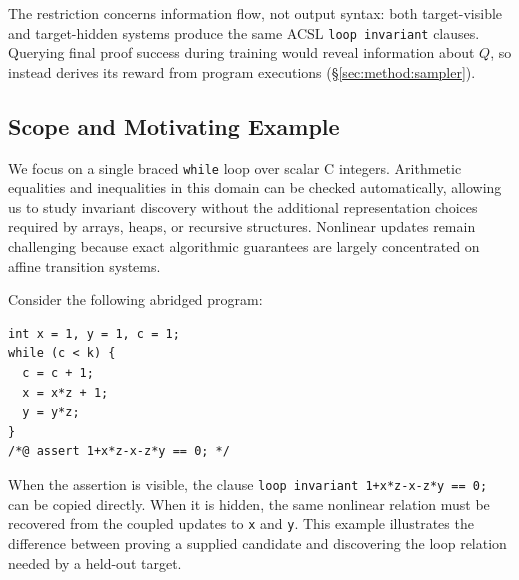 The restriction concerns information flow, not output syntax: both
target-visible and target-hidden systems produce the same ACSL
\texttt{loop invariant} clauses.  Querying final proof success during training
would reveal information about \(Q\), so \sam{} instead derives its reward from
program executions (\S\ref{sec:method:sampler}).

\subsection{Scope and Motivating Example}

We focus on a single braced \texttt{while} loop over scalar C integers.
Arithmetic equalities and inequalities in this domain can be checked
automatically, allowing us to study invariant discovery without the additional
representation choices required by arrays, heaps, or recursive structures.
Nonlinear updates remain challenging because exact algorithmic guarantees are
largely concentrated on affine transition systems.

Consider the following abridged program:
\begin{lstlisting}
int x = 1, y = 1, c = 1;
while (c < k) {
  c = c + 1;
  x = x*z + 1;
  y = y*z;
}
/*@ assert 1+x*z-x-z*y == 0; */
\end{lstlisting}
When the assertion is visible, the clause
\texttt{loop invariant 1+x*z-x-z*y == 0;} can be copied directly.
When it is hidden, the same nonlinear relation must be recovered from the
coupled updates to \texttt{x} and \texttt{y}.  This example illustrates the
difference between proving a supplied candidate and discovering the loop
relation needed by a held-out target.
